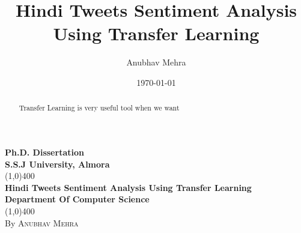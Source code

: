 \documentclass[12pt]{article}
\title{Hindi Tweets Sentiment Analysis Using Transfer Learning}
\author{Anubhav Mehra}
\date{\today}
\begin{document}
\begin{titlepage}
	\begin{center}
		\vspace*{1cm}
			\Huge{\textbf{Ph.D. Dissertation}}\\
			\Huge{\textbf{S.S.J University, Almora}}\\
			\vfill
			\line(1,0){400}\\[1mm]
			\large{\textbf{Hindi Tweets Sentiment Analysis Using Transfer Learning}}\\[3mm]
			\large{\textbf{Department Of Computer Science}}\\[1mm]
			\line(1,0){400}\\[1mm]
			By \textsc{Anubhav Mehra}
			
	\end{center}
\end{titlepage}
\begin{abstract}
Transfer Learning is very useful tool when we want
\end{abstract}
\tableofcontents
\thispagestyle{empty}
\clearpage
\setcounter{page}{1}
\end{document}
